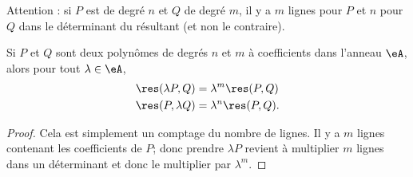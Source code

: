 Attention : si \( P\) est de degré \( n\) et \( Q\) de degré \( m\), il y a \( m\) lignes pour \( P\) et \( n\) pour \( Q\) dans le déterminant du résultant (et non le contraire).

\begin{lemma}       \label{LemBFrhgnA}
    Si \( P\) et \( Q\) sont deux polynômes de degrés \( n\) et \( m\) à coefficients dans l'anneau \( \eA\), alors pour tout \( \lambda\in \eA\),
    \begin{subequations}
        \begin{align}
            \res(\lambda P,Q)&=\lambda^m\res(P,Q)\\
            \res(P,\lambda Q)&=\lambda^n\res(P,Q).
        \end{align}
    \end{subequations}
\end{lemma}

\begin{proof}
    Cela est simplement un comptage du nombre de lignes. Il y a \( m\) lignes contenant les coefficients de \( P\); donc prendre \( \lambda P\) revient à multiplier \( m\) lignes dans un déterminant et donc le multiplier par \( \lambda^m\).
\end{proof}

